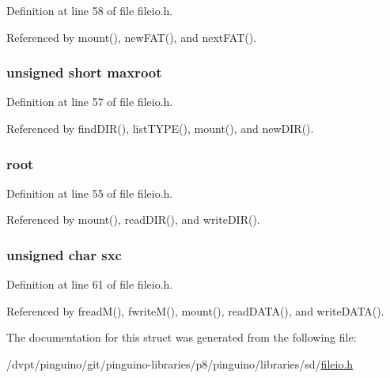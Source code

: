 Definition at line 58 of file fileio.\-h.



Referenced by mount(), new\-F\-A\-T(), and next\-F\-A\-T().

\hypertarget{struct_m_e_d_i_a_a78f14f8c25b8a0d73de86c9c96e068f9}{
\subsubsection[{maxroot}]{\setlength{\rightskip}{0pt plus 5cm}unsigned short maxroot}}\label{struct_m_e_d_i_a_a78f14f8c25b8a0d73de86c9c96e068f9}


Definition at line 57 of file fileio.\-h.



Referenced by find\-D\-I\-R(), list\-T\-Y\-P\-E(), mount(), and new\-D\-I\-R().

\hypertarget{struct_m_e_d_i_a_a484ff55c205f0fa8283a246f2d77f94d}{
\subsubsection[{root}]{ root}}\label{struct_m_e_d_i_a_a484ff55c205f0fa8283a246f2d77f94d}


Definition at line 55 of file fileio.\-h.



Referenced by mount(), read\-D\-I\-R(), and write\-D\-I\-R().

\hypertarget{struct_m_e_d_i_a_ac9daa97bcbd38f1fda0f357dfa22aaa7}{
\subsubsection[{sxc}]{\setlength{\rightskip}{0pt plus 5cm}unsigned char sxc}}\label{struct_m_e_d_i_a_ac9daa97bcbd38f1fda0f357dfa22aaa7}


Definition at line 61 of file fileio.\-h.



Referenced by fread\-M(), fwrite\-M(), mount(), read\-D\-A\-T\-A(), and write\-D\-A\-T\-A().



The documentation for this struct was generated from the following file\-:\begin{DoxyCompactItemize}
\item 
/dvpt/pinguino/git/pinguino-\/libraries/p8/pinguino/libraries/sd/\hyperlink{p8_2pinguino_2libraries_2sd_2fileio_8h}{fileio.\-h}\end{DoxyCompactItemize}
